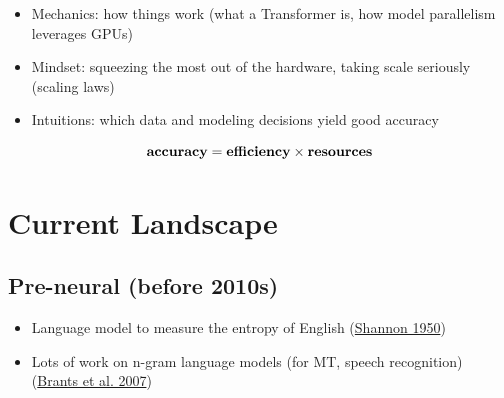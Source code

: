 \begin{itemize}
    \item Mechanics: how things work (what a Transformer is, how model parallelism leverages GPUs)
    \item Mindset: squeezing the most out of the hardware, taking scale seriously (scaling laws)
    \item Intuitions: which data and modeling decisions yield good accuracy
\end{itemize}


\vspace{-0.5\baselineskip}  %
\[
  \text{\textbf{accuracy}} = \text{\textbf{efficiency}} \times \text{\textbf{resources}}
\]



\clearpage

{\chaptoc\noindent\begin{minipage}[inner sep=0,outer sep=0]{0.9\linewidth}\section{Current Landscape}\end{minipage}}

\subsection*{Pre-neural (before 2010s)}
\begin{itemize}[leftmargin=*]
  \item Language model to measure the entropy of English (\href{https://en.wikipedia.org/wiki/Prediction_and_entropy_of_printed_English}{Shannon 1950})
  \item Lots of work on n-gram language models (for MT, speech recognition) (\href{https://www.aclweb.org/anthology/P07-2045/}{Brants et al. 2007})
\end{itemize}

